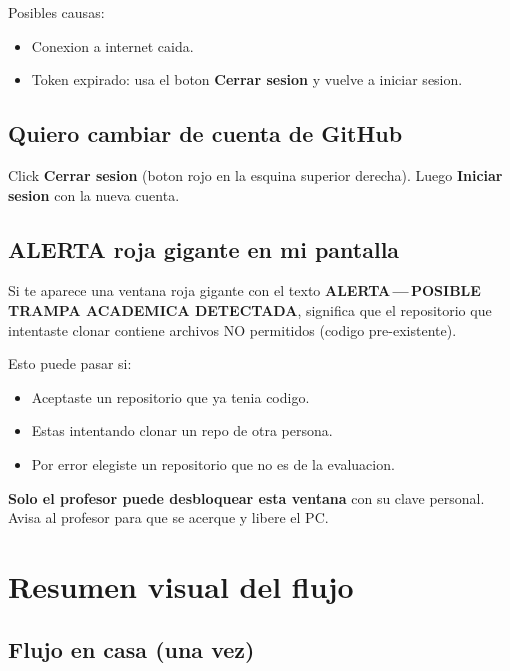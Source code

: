 \documentclass[11pt,a4paper,oneside]{report}
\begin{document}
Posibles causas:

\begin{itemize}
  \item Conexion a internet caida.
  \item Token expirado: usa el boton \textbf{Cerrar sesion} y vuelve a iniciar sesion.
\end{itemize}

\section{Quiero cambiar de cuenta de GitHub}

Click \textbf{Cerrar sesion} (boton rojo en la esquina superior derecha). Luego \textbf{Iniciar sesion} con la nueva cuenta.

\section{ALERTA roja gigante en mi pantalla}

\begin{warnbox}[NO PANIQUEES]
Si te aparece una ventana roja gigante con el texto \textbf{ALERTA\,---\,POSIBLE TRAMPA ACADEMICA DETECTADA}, significa que el repositorio que intentaste clonar contiene archivos NO permitidos (codigo pre-existente).

Esto puede pasar si:
\begin{itemize}
  \item Aceptaste un repositorio que ya tenia codigo.
  \item Estas intentando clonar un repo de otra persona.
  \item Por error elegiste un repositorio que no es de la evaluacion.
\end{itemize}

\textbf{Solo el profesor puede desbloquear esta ventana} con su clave personal. Avisa al profesor para que se acerque y libere el PC.
\end{warnbox}

\chapter{Resumen visual del flujo}

\section{Flujo en casa (una vez)}
\end{document}
